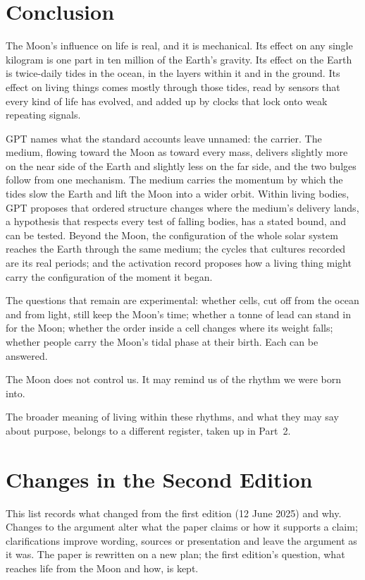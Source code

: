 \documentclass[11pt,a4paper]{article}
\begin{document}
\section{Conclusion}
\label{sec:conclusion}

The Moon's influence on life is real, and it is mechanical. Its effect on any single kilogram is one part in ten million of the Earth's gravity. Its effect on the Earth is twice-daily tides in the ocean, in the layers within it and in the ground. Its effect on living things comes mostly through those tides, read by sensors that every kind of life has evolved, and added up by clocks that lock onto weak repeating signals.

GPT names what the standard accounts leave unnamed: the carrier. The medium, flowing toward the Moon as toward every mass, delivers slightly more on the near side of the Earth and slightly less on the far side, and the two bulges follow from one mechanism. The medium carries the momentum by which the tides slow the Earth and lift the Moon into a wider orbit. Within living bodies, GPT proposes that ordered structure changes where the medium's delivery lands, a hypothesis that respects every test of falling bodies, has a stated bound, and can be tested. Beyond the Moon, the configuration of the whole solar system reaches the Earth through the same medium; the cycles that cultures recorded are its real periods; and the activation record proposes how a living thing might carry the configuration of the moment it began.

The questions that remain are experimental: whether cells, cut off from the ocean and from light, still keep the Moon's time; whether a tonne of lead can stand in for the Moon; whether the order inside a cell changes where its weight falls; whether people carry the Moon's tidal phase at their birth. Each can be answered.

The Moon does not control us. It may remind us of the rhythm we were born into.

The broader meaning of living within these rhythms, and what they may say about purpose, belongs to a different register, taken up in Part~2.

\clearpage
\section*{Changes in the Second Edition}

This list records what changed from the first edition (12 June 2025) and why. Changes to the argument alter what the paper claims or how it supports a claim; clarifications improve wording, sources or presentation and leave the argument as it was. The paper is rewritten on a new plan; the first edition's question, what reaches life from the Moon and how, is kept.
\end{document}
